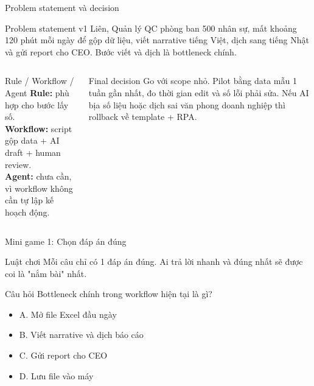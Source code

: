 \documentclass[aspectratio=169,11pt]{beamer}
\begin{document}
\begin{frame}{Problem statement và decision}
  \begin{block}{Problem statement v1}
    \small
    Liên, Quản lý QC phòng ban 500 nhân sự, mất khoảng 120 phút mỗi ngày để gộp dữ liệu, viết narrative tiếng Việt, dịch sang tiếng Nhật và gửi report cho CEO. Bước viết và dịch là bottleneck chính.
  \end{block}

  \begin{columns}[T,onlytextwidth]
    \begin{block}{Rule / Workflow / Agent}
      \small
      \textbf{Rule:} phù hợp cho bước lấy số.\\
      \textbf{Workflow:} script gộp data + AI draft + human review.\\
      \textbf{Agent:} chưa cần, vì workflow không cần tự lập kế hoạch động.
    \end{block}

    \begin{block}{Final decision}
      \small
      Go với scope nhỏ. Pilot bằng data mẫu 1 tuần gần nhất, đo thời gian edit và số lỗi phải sửa. Nếu AI bịa số liệu hoặc dịch sai văn phong doanh nghiệp thì rollback về template + RPA.
    \end{block}
  \end{columns}
\end{frame}

\begin{frame}{Mini game 1: Chọn đáp án đúng}
  \begin{block}{Luật chơi}
    Mỗi câu chỉ có 1 đáp án đúng. Ai trả lời nhanh và đúng nhất sẽ được coi là "nắm bài" nhất.
  \end{block}

  \begin{block}{Câu hỏi}
    Bottleneck chính trong workflow hiện tại là gì?
  \end{block}

  \begin{itemize}
    \item A. Mở file Excel đầu ngày
    \item B. Viết narrative và dịch báo cáo
    \item C. Gửi report cho CEO
    \item D. Lưu file vào máy
  \end{itemize}
\end{frame}
\end{document}
